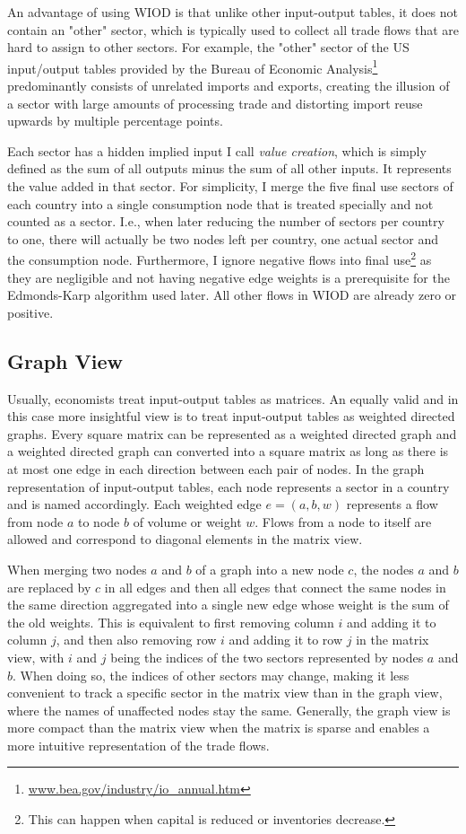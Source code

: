 \documentclass[english]{uzhpub}
\begin{document}
An advantage of using WIOD is that unlike other input-output tables, it does not contain an "other" sector, which is typically used to collect all trade flows that are hard to assign to other sectors. For example, the "other" sector of the US input/output tables provided by the Bureau of Economic Analysis\footnote{\href{http://www.bea.gov/industry/io_annual.htm}{www.bea.gov/industry/io\_annual.htm}} predominantly consists of unrelated imports and exports, creating the illusion of a sector with large amounts of processing trade and distorting import reuse upwards by multiple percentage points.

Each sector has a hidden implied input I call \emph{value creation}, which is simply defined as the sum of all outputs minus the sum of all other inputs. It represents the value added in that sector. For simplicity, I merge the five final use sectors of each country into a single consumption node that is treated specially and not counted as a sector. I.e., when later reducing the number of sectors per country to one, there will actually be two nodes left per country, one actual sector and the consumption node. Furthermore, I ignore negative flows into final use\footnote{This can happen when capital is reduced or inventories decrease.} as they are negligible and not having negative edge weights is a prerequisite for the Edmonds-Karp algorithm used later. \citep{edmonds1972theoretical} All other flows in WIOD are already zero or positive.

\subsection{Graph View}
\label{sec:graphview}
Usually, economists treat input-output tables as matrices. An equally valid and in this case more insightful view is to treat input-output tables as weighted directed graphs. Every square matrix can be represented as a weighted directed graph and a weighted directed graph can converted into a square matrix as long as there is at most one edge in each direction between each pair of nodes. In the graph representation of input-output tables, each node represents a sector in a country and is named accordingly. Each weighted edge $e=(a, b, w)$ represents a flow from node $a$ to node $b$ of volume or weight $w$. Flows from a node to itself are allowed and correspond to diagonal elements in the matrix view.

When merging two nodes $a$ and $b$ of a graph into a new node $c$, the nodes $a$ and $b$ are replaced by $c$ in all edges and then all edges that connect the same nodes in the same direction aggregated into a single new edge whose weight is the sum of the old weights. This is equivalent to first removing column $i$ and adding it to column $j$, and then also removing row $i$ and adding it to row $j$ in the matrix view, with $i$ and $j$ being the indices of the two sectors represented by nodes $a$ and $b$. When doing so, the indices of other sectors may change, making it less convenient to track a specific sector in the matrix view than in the graph view, where the names of unaffected nodes stay the same. Generally, the graph view is more compact than the matrix view when the matrix is sparse and enables a more intuitive representation of the trade flows.
\end{document}
